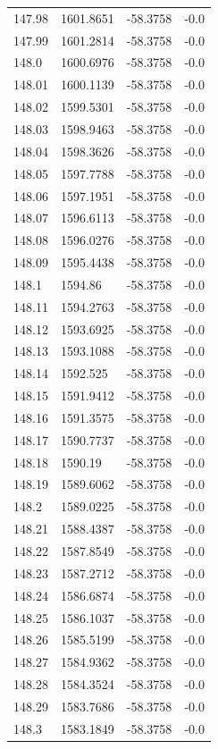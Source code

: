 \begin{table}[H]
\begin{tabular}{llll}
147.98 & 1601.8651 & -58.3758 & -0.0 \\
147.99 & 1601.2814 & -58.3758 & -0.0 \\
148.0 & 1600.6976 & -58.3758 & -0.0 \\
148.01 & 1600.1139 & -58.3758 & -0.0 \\
148.02 & 1599.5301 & -58.3758 & -0.0 \\
148.03 & 1598.9463 & -58.3758 & -0.0 \\
148.04 & 1598.3626 & -58.3758 & -0.0 \\
148.05 & 1597.7788 & -58.3758 & -0.0 \\
148.06 & 1597.1951 & -58.3758 & -0.0 \\
148.07 & 1596.6113 & -58.3758 & -0.0 \\
148.08 & 1596.0276 & -58.3758 & -0.0 \\
148.09 & 1595.4438 & -58.3758 & -0.0 \\
148.1 & 1594.86 & -58.3758 & -0.0 \\
148.11 & 1594.2763 & -58.3758 & -0.0 \\
148.12 & 1593.6925 & -58.3758 & -0.0 \\
148.13 & 1593.1088 & -58.3758 & -0.0 \\
148.14 & 1592.525 & -58.3758 & -0.0 \\
148.15 & 1591.9412 & -58.3758 & -0.0 \\
148.16 & 1591.3575 & -58.3758 & -0.0 \\
148.17 & 1590.7737 & -58.3758 & -0.0 \\
148.18 & 1590.19 & -58.3758 & -0.0 \\
148.19 & 1589.6062 & -58.3758 & -0.0 \\
148.2 & 1589.0225 & -58.3758 & -0.0 \\
148.21 & 1588.4387 & -58.3758 & -0.0 \\
148.22 & 1587.8549 & -58.3758 & -0.0 \\
148.23 & 1587.2712 & -58.3758 & -0.0 \\
148.24 & 1586.6874 & -58.3758 & -0.0 \\
148.25 & 1586.1037 & -58.3758 & -0.0 \\
148.26 & 1585.5199 & -58.3758 & -0.0 \\
148.27 & 1584.9362 & -58.3758 & -0.0 \\
148.28 & 1584.3524 & -58.3758 & -0.0 \\
148.29 & 1583.7686 & -58.3758 & -0.0 \\
148.3 & 1583.1849 & -58.3758 & -0.0 \\

\end{tabular}
\end{table}
